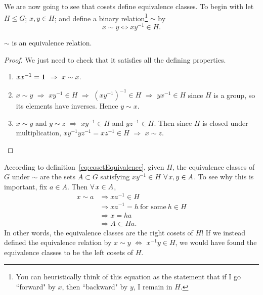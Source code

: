 We are now going to see that cosets define equivalence classes. To begin with
let $H\le G$; $x,y\in H$; and define a binary relation\footnote{You can
heuristically think of this equation as the statement that if I go ``forward" by
$x$, then ``backward" by $y$, I remain in $H$.} $\sim$ by
\begin{equation}\label{eq:cosetEquivalence}
  x\sim y \Leftrightarrow xy^{-1}\in H.
\end{equation}
\begin{proposition}{}{}
  $\sim$ is an equivalence relation.
  \begin{proof}
    We just need to check that it satisfies all the defining properties.
    \begin{enumerate}
      \item $xx^{-1}={\mathbf 1}$ $\Rightarrow$ $x\sim x$.
      \item $x\sim y$ $\Rightarrow$ $xy^{-1}\in H$ $\Rightarrow$
            $(xy^{-1})^{-1}\in H$ $\Rightarrow$ $yx^{-1}\in H$
            since $H$ is a group, so its elements have inverses.
            Hence $y\sim x$.
      \item $x\sim y$ and $y\sim z$ $\Rightarrow$ $xy^{-1}\in H$ and
            $yz^{-1}\in H$. Then since $H$ is closed under multiplication,
            $xy^{-1}yz^{-1}=xz^{-1}\in H$ $\Rightarrow$ $x\sim z$.
    \end{enumerate}
  \end{proof}
\end{proposition}
According to definition~\eqref{eq:cosetEquivalence}, given $H$,
the equivalence classes of $G$ under $\sim$ are the sets
$A\subset G$ satisfying $xy^{-1}\in H$ $\operatorname{\forall} x,y\in A$. To see why this is
important, fix $a\in A$. Then $\operatorname{\forall} x\in A$,
\begin{equation}
  \begin{aligned}
    x\sim a &\Rightarrow xa^{-1}\in H \\
            &\Rightarrow xa^{-1}=h~\text{for some}~h\in H\\
            &\Rightarrow x=ha\\
            &\Rightarrow A\subset Ha.
  \end{aligned}
\end{equation}
In other words, the equivalence classes are the right cosets of $H$! If we
instead defined the equivalence relation by $x\sim y$ $\Leftrightarrow$
$x^{-1}y\in H$, we would have found the equivalence classes to be the left
cosets of $H$.
